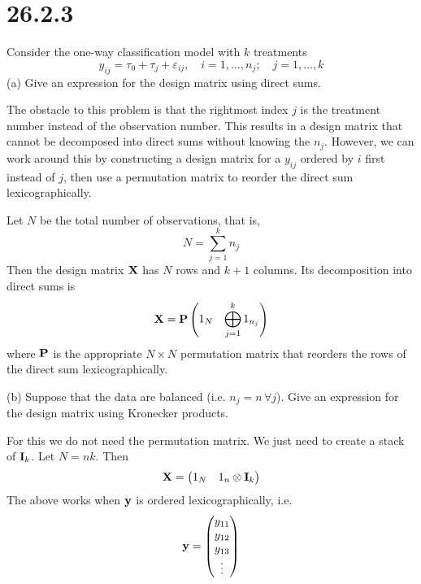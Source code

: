 \section*{26.2.3}
Consider the one-way classification model with $k$ treatments
$$y_{ij}=\tau_0+\tau_j+\varepsilon_{ij},\quad
i=1,\ldots,n_j;\quad j=1,\ldots,k$$
(a) Give an expression for the design matrix using direct sums.

\bigskip
\noindent
The obstacle to this problem is that the rightmost index $j$ is
the treatment number instead of the observation number.
This results in a
design matrix that cannot be decomposed into direct sums without
knowing the $n_j$.
However, we can work around this by constructing a design matrix
for a $y_{ij}$ ordered by $i$ first instead of $j$, then use a permutation matrix to reorder the direct sum lexicographically.


\bigskip
\noindent
Let $N$ be the total number of observations, that is,
$$N=\sum_{j=1}^kn_j$$
Then the design matrix $\bf X$ has $N$ rows and $k+1$ columns.
Its decomposition into direct sums is
$${\bf X}={\bf P}\left(\begin{matrix}
1_N & \displaystyle{\bigoplus_{j=1}^k1_{n_j}}\end{matrix}\right)$$
where $\bf P$ is the appropriate $N\times N$ permutation matrix
that reorders the rows of the direct sum lexicographically.

\bigskip
\noindent
(b) Suppose that the data are balanced (i.e. $n_j=n\,\forall j$).
Give an expression for the design matrix using Kronecker products.

\bigskip
\noindent
For this we do not need the permutation matrix.
We just need to create a stack of ${\bf I}_k$.
Let $N=nk$. Then
$${\bf X}=\left(\begin{matrix}1_N & 1_n\otimes{\bf I}_k
\end{matrix}\right)$$
The above works when $\bf y$ is ordered lexicographically, i.e.
$${\bf y}=\left(\begin{matrix}
y_{11}\cr
y_{12}\cr
y_{13}\cr
\vdots
\end{matrix}\right)
$$
